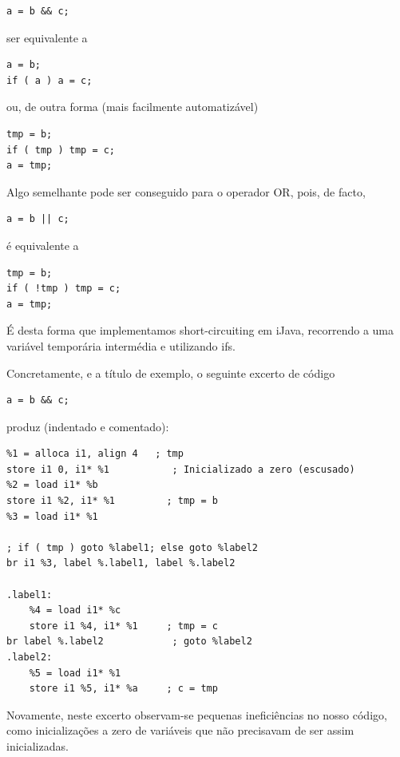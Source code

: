 \documentclass[11pt,a4paper]{article}
\begin{document}
\begin{lstlisting}
a = b && c;
\end{lstlisting}

ser equivalente a

\begin{lstlisting}
a = b;
if ( a ) a = c;
\end{lstlisting}

ou, de outra forma (mais facilmente automatizável)

\begin{lstlisting}
tmp = b;
if ( tmp ) tmp = c;
a = tmp;
\end{lstlisting}

Algo semelhante pode ser conseguido para o operador OR, pois, de facto,

\begin{lstlisting}
a = b || c;
\end{lstlisting}

é equivalente a

\begin{lstlisting}
tmp = b;
if ( !tmp ) tmp = c;
a = tmp;
\end{lstlisting}

É desta forma que implementamos short-circuiting em iJava, recorrendo a uma variável temporária intermédia e utilizando ifs. 

Concretamente, e a título de exemplo, o seguinte excerto de código
\begin{lstlisting}
a = b && c;
\end{lstlisting}

produz (indentado e comentado):

\begin{lstlisting}
%1 = alloca i1, align 4   ; tmp
store i1 0, i1* %1           ; Inicializado a zero (escusado)
%2 = load i1* %b
store i1 %2, i1* %1         ; tmp = b
%3 = load i1* %1

; if ( tmp ) goto %label1; else goto %label2
br i1 %3, label %.label1, label %.label2  

.label1:
    %4 = load i1* %c
    store i1 %4, i1* %1     ; tmp = c
br label %.label2            ; goto %label2
.label2:
    %5 = load i1* %1                                   
    store i1 %5, i1* %a     ; c = tmp
\end{lstlisting}

Novamente, neste excerto observam-se pequenas ineficiências no nosso código, como inicializações a zero de variáveis que não precisavam de ser assim inicializadas.
\end{document}
